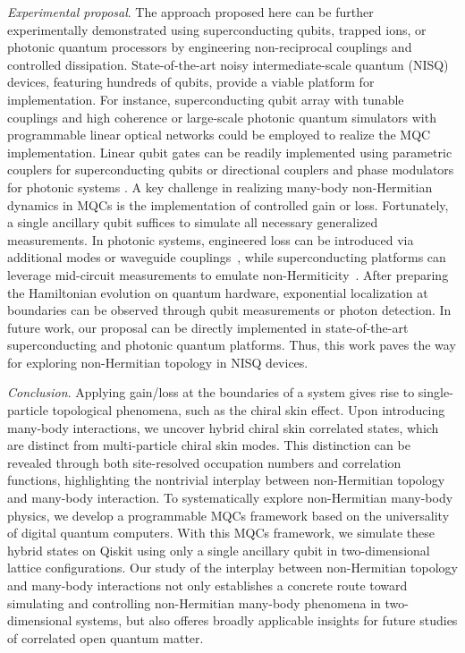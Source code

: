 \documentclass[longbibliography, aps, prx, amsmath, amssymb, amsfonts, twocolumn,superscriptaddress, footinbib]{revtex4-1}
\begin{document}
	\textit{Experimental proposal}. The approach proposed here can be further experimentally demonstrated using superconducting qubits, trapped ions, or photonic quantum processors by engineering non-reciprocal couplings and controlled dissipation. State-of-the-art noisy intermediate-scale quantum (NISQ) devices, featuring hundreds of qubits, provide a viable platform for implementation. For instance, superconducting qubit array with tunable couplings and high coherence \cite{guo2021observation, preskill2018quantum, wu2021strong} or large-scale photonic quantum simulators with programmable linear optical networks \cite{zhong2020quantum, madsen2022quantum, zhu2024dynamically} could be employed to realize the MQC implementation. Linear qubit gates can be readily implemented using parametric couplers for superconducting qubits or directional couplers and phase modulators for photonic systems \cite{zhu2024large}. A key challenge in realizing many-body non-Hermitian dynamics in MQCs is the implementation of controlled gain or loss. Fortunately, a single ancillary qubit suffices to simulate all necessary generalized measurements. In photonic systems, engineered loss can be introduced via additional modes or waveguide couplings~\cite{hoch2025quantum, carolan2020variational}, while superconducting platforms can leverage mid-circuit measurements to emulate non-Hermiticity~\cite{shen2024enhanced,shen2025observation}. After preparing the Hamiltonian evolution on quantum hardware, exponential localization at boundaries can be observed through qubit measurements or photon detection.  In future work, our proposal can be directly implemented in state-of-the-art superconducting and photonic quantum platforms. Thus, this work paves the way for exploring non-Hermitian topology in NISQ devices.

	\textit{Conclusion}. Applying gain/loss at the boundaries of a system gives rise to single-particle topological phenomena, such as the chiral skin effect. Upon introducing many-body interactions, we uncover hybrid chiral skin correlated states, which are distinct from multi-particle chiral skin modes. This distinction can be revealed through both site-resolved occupation numbers and correlation functions, highlighting the nontrivial interplay between non-Hermitian topology and many-body interaction. 
	To systematically explore non-Hermitian many-body physics, we develop a programmable MQCs framework based on the universality of digital quantum computers. 
	With this MQCs framework, we simulate these hybrid states on Qiskit using only a single ancillary qubit in two-dimensional lattice configurations. 
	Our study of the interplay between non-Hermitian topology and many-body interactions not only establishes a concrete route toward simulating and controlling non-Hermitian many-body phenomena in two-dimensional systems, but also offeres broadly applicable insights for future studies of correlated open quantum matter.
\end{document}
